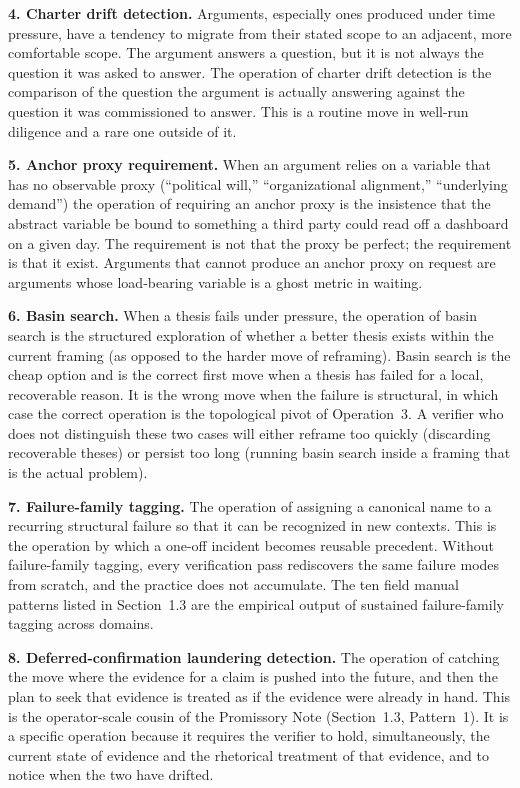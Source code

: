 \documentclass[11pt]{article}
\begin{document}
\textbf{4. Charter drift detection.} Arguments, especially ones produced under time pressure, have a tendency to migrate from their stated scope to an adjacent, more comfortable scope. The argument answers a question, but it is not always the question it was asked to answer. The operation of charter drift detection is the comparison of the question the argument is actually answering against the question it was commissioned to answer. This is a routine move in well-run diligence and a rare one outside of it.

\textbf{5. Anchor proxy requirement.} When an argument relies on a variable that has no observable proxy (``political will,'' ``organizational alignment,'' ``underlying demand'') the operation of requiring an anchor proxy is the insistence that the abstract variable be bound to something a third party could read off a dashboard on a given day. The requirement is not that the proxy be perfect; the requirement is that it exist. Arguments that cannot produce an anchor proxy on request are arguments whose load-bearing variable is a ghost metric in waiting.

\textbf{6. Basin search.} When a thesis fails under pressure, the operation of basin search is the structured exploration of whether a better thesis exists within the current framing (as opposed to the harder move of reframing). Basin search is the cheap option and is the correct first move when a thesis has failed for a local, recoverable reason. It is the wrong move when the failure is structural, in which case the correct operation is the topological pivot of Operation~3. A verifier who does not distinguish these two cases will either reframe too quickly (discarding recoverable theses) or persist too long (running basin search inside a framing that is the actual problem).

\textbf{7. Failure-family tagging.} The operation of assigning a canonical name to a recurring structural failure so that it can be recognized in new contexts. This is the operation by which a one-off incident becomes reusable precedent. Without failure-family tagging, every verification pass rediscovers the same failure modes from scratch, and the practice does not accumulate. The ten field manual patterns listed in Section~1.3 are the empirical output of sustained failure-family tagging across domains.

\textbf{8. Deferred-confirmation laundering detection.} The operation of catching the move where the evidence for a claim is pushed into the future, and then the plan to seek that evidence is treated as if the evidence were already in hand. This is the operator-scale cousin of the Promissory Note (Section~1.3, Pattern~1). It is a specific operation because it requires the verifier to hold, simultaneously, the current state of evidence and the rhetorical treatment of that evidence, and to notice when the two have drifted.
\end{document}
